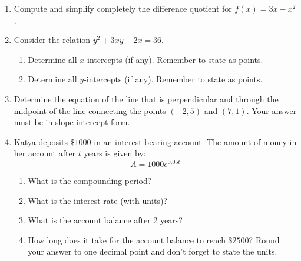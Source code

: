 \documentclass[letterpaper,12pt,fleqn]{article}
\begin{document}
\begin{enumerate}
\begin{enumerate}
    \vspace{1in}

  \end{enumerate}

\item Compute and simplify completely the difference quotient for $f(x)=3x-x^2$.

  \newpage

\item Consider the relation $y^2+3xy-2x=36$.
  \begin{enumerate}
  \item Determine all $x$-intercepts (if any). Remember to state as points.

    \vspace{1.5in}
    
  \item Determine all $y$-intercepts (if any). Remember to state as points.
    
    \vspace{1.5in}
    
  \end{enumerate}

\item Determine the equation of the line that is perpendicular and through the midpoint
  of the line connecting the points $(-2,5)$ and $(7,1)$. Your answer must be in
  slope-intercept form.

  \newpage

\item Katya deposits $\$1000$ in an interest-bearing account. The amount of money in
  her account after $t$ years is given by:
  \[A=1000e^{0.05t}\]
  \begin{enumerate}
  \item What is the compounding period?

    \vspace{1in}

  \item What is the interest rate (with units)?
    
    \vspace{1in}

  \item What is the account balance after 2 years?

    \vspace{2in}

  \item How long does it take for the account balance to reach $\$2500$? Round your
    answer to one decimal point and don't forget to state the units.


\end{enumerate}
\end{enumerate}
\end{document}
